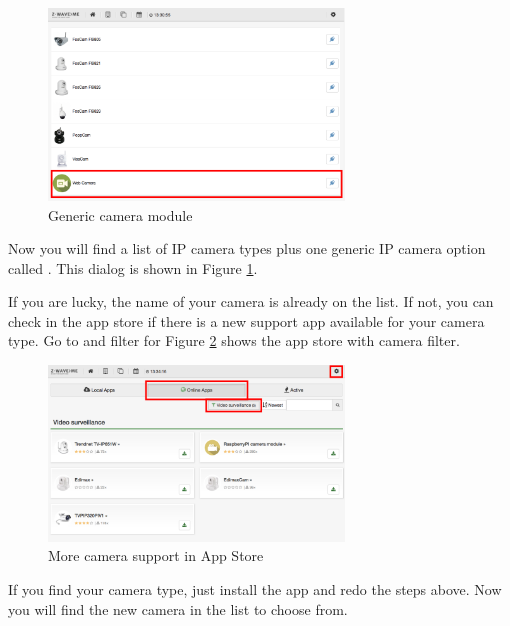 \begin{figure}
\begin{center}
\includegraphics[width=0.7\textwidth]{pngs/cap9/camera2.png}
\caption{Generic camera module}
\label{camera2}
\end{center}
\end{figure}

Now you will find a list of IP camera types plus one generic IP camera option 
called . This dialog is shown in Figure \ref{camera2}.

If you are lucky, the name of your camera is already on the list. If not, you can 
check in the app store if there is a new support app available for your camera type. 
Go to  and filter for  
Figure \ref{camera3} shows the app store with camera filter.

\begin{figure}
\begin{center}
\includegraphics[width=0.7\textwidth]{pngs/cap9/camera3.png}
\caption{More camera support in App Store}
\label{camera3}
\end{center}
\end{figure}

If you find your camera type, just install the app and redo the steps above. Now you will 
find the new camera in the list to choose from.

